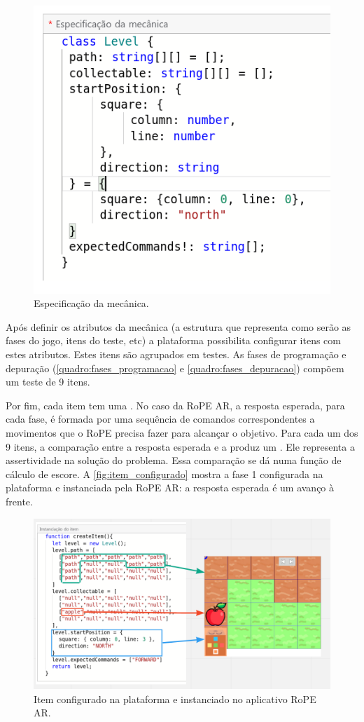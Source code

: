 \begin{figure}[!htpb]
    \centering
    \includegraphics[width=.5\linewidth,fbox]{figs/mecanica.png}
    \caption{Especificação da mecânica.}
    \sourceauthor
    \label{fig:mecanica}
\end{figure}

Após definir os atributos da mecânica (a estrutura que representa como serão as fases do jogo, itens do teste, etc) a plataforma possibilita configurar itens com estes atributos. Estes itens são agrupados em testes. As fases de programação e depuração (\autoref{quadro:fases_programacao} e \autoref{quadro:fases_depuracao}) compõem um teste de 9 itens.

Por fim, cada item tem uma . No caso da RoPE AR, a resposta esperada, para cada fase, é formada por uma sequência de comandos correspondentes a movimentos que o RoPE precisa fazer para alcançar o objetivo. Para cada um dos 9 itens, a comparação entre a resposta esperada e a  produz um . Ele representa a assertividade na solução do problema. Essa comparação se dá numa função de cálculo de escore. A \autoref{fig:item_configurado} mostra a fase 1 configurada na plataforma e instanciada pela RoPE AR: a resposta esperada é um avanço à frente.

\begin{figure}[!htpb]
    \centering
    \includegraphics[width=.6\linewidth,fbox]{figs/item_configurado.png}
    \caption{Item configurado na plataforma e instanciado no aplicativo RoPE AR.}
    \sourceauthor
    \label{fig:item_configurado}
\end{figure}

